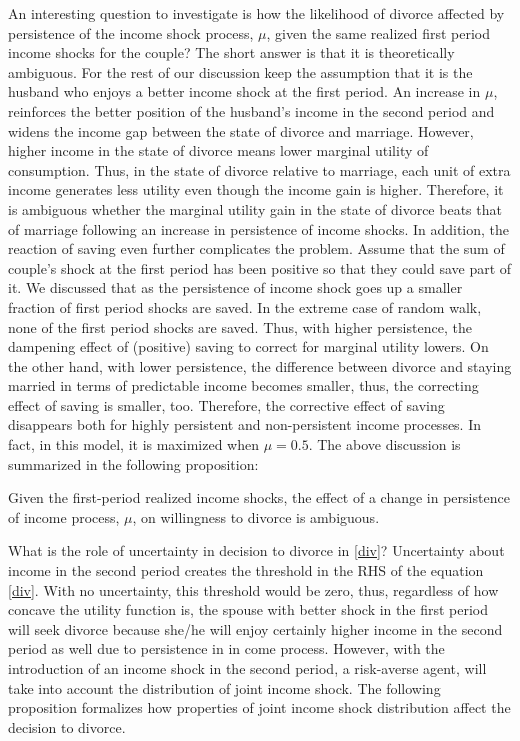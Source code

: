 An interesting question to investigate is how the likelihood of divorce affected by persistence of the income shock process, $\mu$, given the same realized first period income shocks for the couple? The short answer is that it is theoretically ambiguous. For the rest of our discussion keep the assumption that it is the husband who enjoys a better income shock at the first period. An increase in $\mu$, reinforces the better position of the husband's income in the second period and widens the income gap between the state of divorce and marriage. However, higher income in the state of divorce means lower marginal utility of consumption. Thus, in the state of divorce relative to marriage, each unit of extra income generates less utility even though the income gain is higher. Therefore, it is ambiguous whether the marginal utility gain in the state of divorce beats that of marriage following an increase in persistence of income shocks. In addition, the reaction of saving even further complicates the problem. Assume that the sum of couple's shock at the first period has been positive so that they could save part of it. We discussed that as the persistence of income shock goes up a smaller fraction of first period shocks are saved. In the extreme case of random walk, none of the first period shocks are saved. Thus, with higher persistence, the dampening effect of (positive) saving to correct for marginal utility lowers. On the other hand, with lower persistence, the difference between divorce and staying married in terms of predictable income becomes smaller, thus, the correcting effect of saving is smaller, too. Therefore, the corrective effect of saving disappears both for highly persistent and non-persistent income processes. In fact, in this model, it is maximized when $\mu = 0.5$. The above discussion is summarized in the following proposition:

\begin{prop}
Given the first-period realized income shocks, the effect of a change in persistence of income process, $\mu$, on willingness to divorce is ambiguous.
\end{prop}

 
What is the role of uncertainty in decision to divorce in \eqref{div}? Uncertainty about income in the second period creates the threshold in the RHS of the equation \eqref{div}. With no uncertainty, this threshold would be zero, thus, regardless of how concave the utility function is, the spouse with better shock in the first period will seek divorce because she/he  will enjoy certainly higher income in the second period as well due to persistence in in come process.  However, with the introduction of an income shock in the second period, a risk-averse agent, will take into account the distribution of joint income shock. The following proposition formalizes how properties of joint income shock distribution affect the decision to divorce. 

